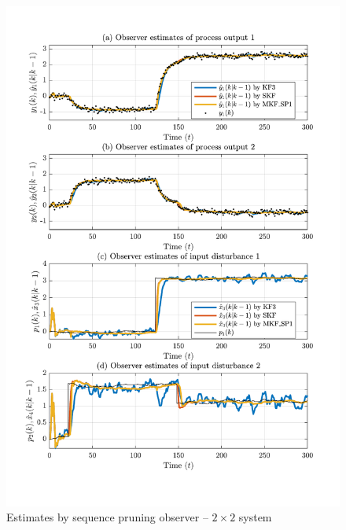 \begin{figure}[htp]
	\centering
	\includegraphics[width=12cm]{images/rod_obs_sim2_all_seed_y_est1_SP1.pdf}
	\caption{Estimates by sequence pruning observer –  $2\times2$ system}
	\label{fig:rod-obs-sim2-yest-1-SP}
\end{figure}

